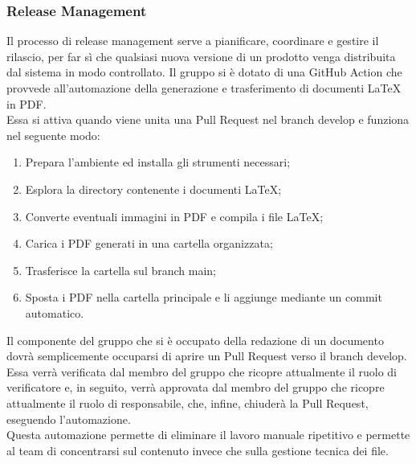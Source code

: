 \subsubsection{Release Management}
Il processo di release management serve a pianificare, coordinare e gestire il rilascio, per far sì che qualsiasi nuova versione di un prodotto venga distribuita dal sistema in modo controllato.
Il gruppo si è dotato di una GitHub Action che provvede all'automazione della generazione e trasferimento di documenti LaTeX in PDF.\\
Essa si attiva quando viene unita una Pull Request nel branch develop e funziona nel seguente modo: 
\begin{enumerate}
    \item Prepara l'ambiente ed installa gli strumenti necessari;
    \item Esplora la directory contenente i documenti LaTeX;
    \item Converte eventuali immagini in PDF e compila i file LaTeX;
    \item Carica i PDF generati in una cartella organizzata;
    \item Trasferisce la cartella sul branch main;
    \item Sposta i PDF nella cartella principale e li aggiunge mediante un commit automatico.
\end{enumerate}
Il componente del gruppo che si è occupato della redazione di un documento dovrà semplicemente occuparsi di aprire un Pull Request verso il branch develop. Essa verrà verificata dal membro del gruppo che ricopre attualmente il ruolo di verificatore e, in seguito, verrà approvata dal membro del gruppo che ricopre attualmente il ruolo di responsabile, che, infine, chiuderà la Pull Request, eseguendo l'automazione.\\
Questa automazione permette di eliminare il lavoro manuale ripetitivo e permette al team di concentrarsi sul contenuto invece che sulla gestione tecnica dei file.